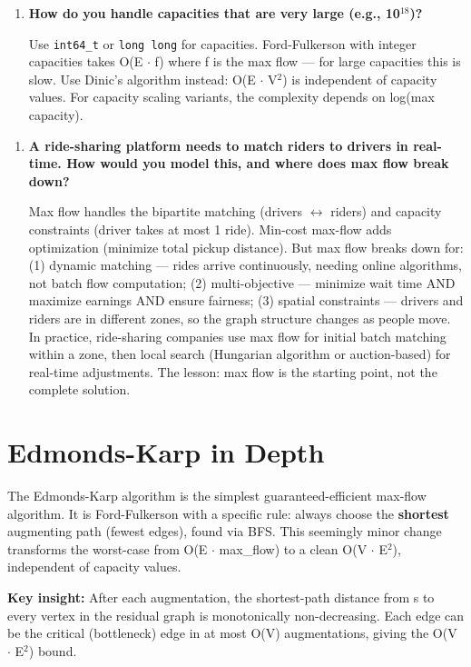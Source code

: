 \begin{enumerate}
\item \textbf{How do you handle capacities that are very large (e.g., 10$^{18}$)?}

Use \texttt{int64\_t} or \texttt{long long} for capacities. Ford-Fulkerson with integer capacities takes O(E $\cdot$ f) where f is the max flow — for large capacities this is slow. Use Dinic's algorithm instead: O(E $\cdot$ V$^{2}$) is independent of capacity values. For capacity scaling variants, the complexity depends on log(max capacity).
\end{enumerate}

\begin{enumerate}
\item \textbf{A ride-sharing platform needs to match riders to drivers in real-time. How would you model this, and where does max flow break down?}\label{faq:ridesharing-flow}

Max flow handles the bipartite matching (drivers $\leftrightarrow$ riders) and capacity constraints (driver takes at most 1 ride). Min-cost max-flow adds optimization (minimize total pickup distance). But max flow breaks down for: (1) dynamic matching — rides arrive continuously, needing online algorithms, not batch flow computation; (2) multi-objective — minimize wait time AND maximize earnings AND ensure fairness; (3) spatial constraints — drivers and riders are in different zones, so the graph structure changes as people move. In practice, ride-sharing companies use max flow for initial batch matching within a zone, then local search (Hungarian algorithm or auction-based) for real-time adjustments. The lesson: max flow is the starting point, not the complete solution.
\end{enumerate}


\section{Edmonds-Karp in Depth}

The Edmonds-Karp algorithm is the simplest guaranteed-efficient max-flow algorithm. It is Ford-Fulkerson with a specific rule: always choose the \textbf{shortest} augmenting path (fewest edges), found via BFS. This seemingly minor change transforms the worst-case from O(E $\cdot$ max\_flow) to a clean O(V $\cdot$ E$^{2}$), independent of capacity values.

\textbf{Key insight:} After each augmentation, the shortest-path distance from s to every vertex in the residual graph is monotonically non-decreasing. Each edge can be the critical (bottleneck) edge in at most O(V) augmentations, giving the O(V $\cdot$ E$^{2}$) bound.

